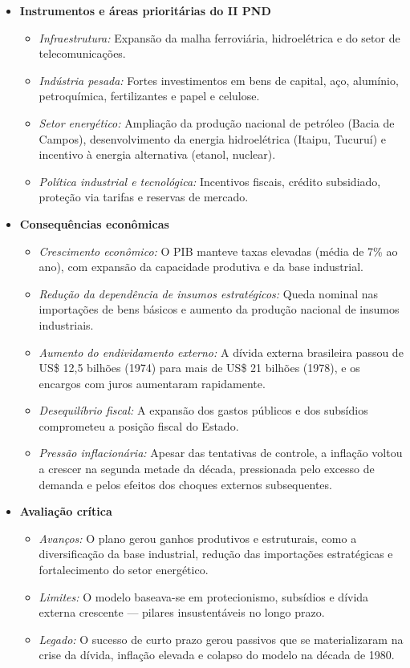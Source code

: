 \documentclass{sciposter}
\begin{document}
\begin{multicols}{3}
\begin{itemize}
    \item \textbf{Instrumentos e áreas prioritárias do II PND}
    \begin{itemize}
        \item \textit{Infraestrutura:} Expansão da malha ferroviária, hidroelétrica e do setor de telecomunicações.
        \item \textit{Indústria pesada:} Fortes investimentos em bens de capital, aço, alumínio, petroquímica, fertilizantes e papel e celulose.
        \item \textit{Setor energético:} Ampliação da produção nacional de petróleo (Bacia de Campos), desenvolvimento da energia hidroelétrica (Itaipu, Tucuruí) e incentivo à energia alternativa (etanol, nuclear).
        \item \textit{Política industrial e tecnológica:} Incentivos fiscais, crédito subsidiado, proteção via tarifas e reservas de mercado.
    \end{itemize}

    \item \textbf{Consequências econômicas}
    \begin{itemize}
        \item \textit{Crescimento econômico:} O PIB manteve taxas elevadas (média de 7\% ao ano), com expansão da capacidade produtiva e da base industrial.
        \item \textit{Redução da dependência de insumos estratégicos:} Queda nominal nas importações de bens básicos e aumento da produção nacional de insumos industriais.
        \item \textit{Aumento do endividamento externo:} A dívida externa brasileira passou de US\$ 12,5 bilhões (1974) para mais de US\$ 21 bilhões (1978), e os encargos com juros aumentaram rapidamente.
        \item \textit{Desequilíbrio fiscal:} A expansão dos gastos públicos e dos subsídios comprometeu a posição fiscal do Estado.
        \item \textit{Pressão inflacionária:} Apesar das tentativas de controle, a inflação voltou a crescer na segunda metade da década, pressionada pelo excesso de demanda e pelos efeitos dos choques externos subsequentes.
    \end{itemize}

    \item \textbf{Avaliação crítica}
    \begin{itemize}
        \item \textit{Avanços:} O plano gerou ganhos produtivos e estruturais, como a diversificação da base industrial, redução das importações estratégicas e fortalecimento do setor energético.
        \item \textit{Limites:} O modelo baseava-se em protecionismo, subsídios e dívida externa crescente — pilares insustentáveis no longo prazo.
        \item \textit{Legado:} O sucesso de curto prazo gerou passivos que se materializaram na crise da dívida, inflação elevada e colapso do modelo na década de 1980.
    \end{itemize}
\end{itemize}


\end{multicols}
\end{document}
